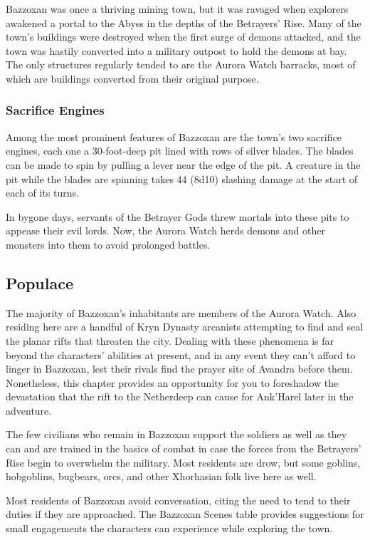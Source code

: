 \documentclass[10pt,a4paper,twoside,twocolumn,openany,nodeprecatedcode]{dndbook}
\begin{document}
Bazzoxan was once a thriving mining town, but it was ravaged when explorers awakened a portal to the Abyss in the depths of the Betrayers' Rise. Many of the town's buildings were destroyed when the first surge of demons attacked, and the town was hastily converted into a military outpost to hold the demons at bay. The only structures regularly tended to are the Aurora Watch barracks, most of which are buildings converted from their original purpose.

\subsubsection{Sacrifice Engines}
Among the most prominent features of Bazzoxan are the town's two sacrifice engines, each one a 30-foot-deep pit lined with rows of silver blades. The blades can be made to spin by pulling a lever near the edge of the pit. A creature in the pit while the blades are spinning takes 44 (8d10) slashing damage at the start of each of its turns.

In bygone days, servants of the Betrayer Gods threw mortals into these pits to appease their evil lords. Now, the Aurora Watch herds demons and other monsters into them to avoid prolonged battles.

\subsection{Populace}
The majority of Bazzoxan's inhabitants are members of the Aurora Watch. Also residing here are a handful of Kryn Dynasty arcanists attempting to find and seal the planar rifts that threaten the city. Dealing with these phenomena is far beyond the characters' abilities at present, and in any event they can't afford to linger in Bazzoxan, lest their rivals find the prayer site of Avandra before them. Nonetheless, this chapter provides an opportunity for you to foreshadow the devastation that the rift to the Netherdeep can cause for Ank'Harel later in the adventure.

The few civilians who remain in Bazzoxan support the soldiers as well as they can and are trained in the basics of combat in case the forces from the Betrayers' Rise begin to overwhelm the military. Most residents are drow, but some goblins, hobgoblins, bugbears, orcs, and other Xhorhasian folk live here as well.

Most residents of Bazzoxan avoid conversation, citing the need to tend to their duties if they are approached. The Bazzoxan Scenes table provides suggestions for small engagements the characters can experience while exploring the town.
\end{document}
